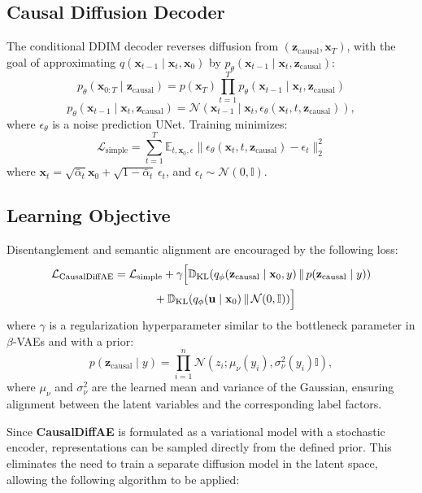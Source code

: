 \documentclass{article}
\newcommand{\x}{\mathbf{x}}
\newcommand{\ub}{\mathbf{u}}
\newcommand{\zc}{\textbf{z}_\text{causal}}
\newcommand{\N}{\mathcal{N}}
\newcommand{\E}{\mathbb{E}}
\newcommand{\D}{\mathbb{D}}
\newcommand{\dklbar}{\,\|\,}
\begin{document}
	\subsection*{Causal Diffusion Decoder}
	
	The conditional DDIM decoder reverses diffusion from $(\zc, \x_T)$, with the goal of approximating $q(\x_{t-1} \mid \x_t, \x_0)$ by $p_\theta(\x_{t-1} \mid \x_t, \zc)$:
	$$
	p_\theta(\x_{0:T} \mid \zc) = p(\x_T) \prod_{t=1}^T p_\theta(\x_{t-1} \mid \x_t, \zc)
	$$
	$$
	p_\theta(\x_{t-1} \mid \x_t, \zc) = \N(\x_{t-1}\;|\; \x_t, \epsilon_\theta(\x_t, t, \zc)),
	$$
	where $\epsilon_\theta$ is a noise prediction UNet. Training minimizes:
	$$
	\mathcal{L}_{\mathrm{simple}} = \sum_{t=1}^{T} \E_{t, \x_0, \epsilon} \| \epsilon_\theta(\x_t, t, \zc) - \epsilon_t \|_2^2
	$$
	where $\x_t = \sqrt{\bar{\alpha}_t} \x_0 + \sqrt{1-\bar{\alpha}_t}\,\epsilon_t$, and $\epsilon_t \sim \N(0, \mathbb{I})$.
	
	\subsection*{Learning Objective}
	
	Disentanglement and semantic alignment are encouraged by the following loss:
	\begin{align*}
		\mathcal{L}_{\mathrm{CausalDiffAE}} &= \mathcal{L}_{\mathrm{simple}} 
		+ \gamma \Big[ \D_{\mathrm{KL}}(q_\phi(\zc \mid \x_0, y) \dklbar p(\zc \mid y)) \\
		&\hspace{3.5em} + \D_{\mathrm{KL}}(q_\phi(\ub \mid \x_0) \dklbar \N(0, \mathbb{I}))\Big]
	\end{align*}
	where $\gamma$ is a regularization hyperparameter similar to the bottleneck parameter in $\beta$-VAEs and with a prior:
	$$
	p(\zc \mid y) = \prod_{i=1}^n \N(z_i ; \mu_\nu(y_i), \sigma^2_\nu(y_i)\mathbb{I}),
	$$	
	where $\mu_\nu$ and $\sigma_\nu^2$ are the learned mean and variance of the Gaussian, ensuring alignment between the latent variables and the corresponding label factors.
	
	Since \textbf{CausalDiffAE} is formulated as a variational model with a stochastic encoder, representations can be sampled directly from the defined prior. This eliminates the need to train a separate diffusion model in the latent space, allowing the following algorithm to be applied:
	
\end{document}
